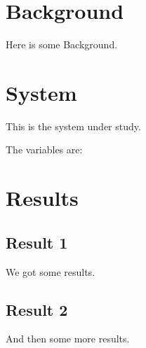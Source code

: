 \documentclass{article}
\begin{document}
\tableofcontents

\section{Background}  %

Here is some Background.

\section{System} %

This is the system under study.

The variables are:


\section{Results}

\subsection{Result 1}  %

We got some results.

\subsection{Result 2}  %

And then some more results.
\end{document}
